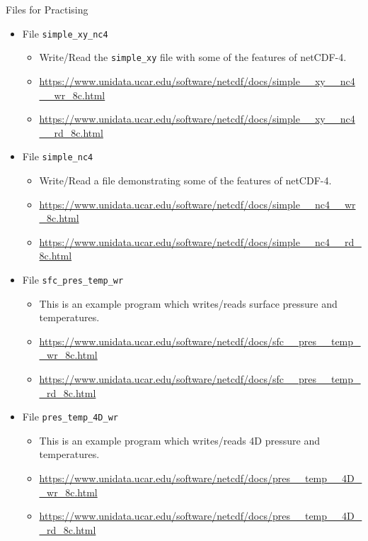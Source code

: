 \documentclass[compress,11pt,xcolor=svgnames,aspectratio=169]{beamer}
\begin{document}
\begin{frame}[fragile]{Files for Practising}

\begin{itemize}

  \item {\scriptsize File \verb|simple_xy_nc4|}
    \begin{itemize}
      \item {\scriptsize Write/Read the \verb|simple_xy| file with some of the features of netCDF-4.}
      \item {\tiny \url{https://www.unidata.ucar.edu/software/netcdf/docs/simple__xy__nc4__wr_8c.html}}
      \item {\tiny \url{https://www.unidata.ucar.edu/software/netcdf/docs/simple__xy__nc4__rd_8c.html}}
    \end{itemize}

  \item {\scriptsize File \verb|simple_nc4|}
    \begin{itemize}
      \item {\scriptsize Write/Read a file demonstrating some of the features of netCDF-4.}
      \item {\tiny \url{https://www.unidata.ucar.edu/software/netcdf/docs/simple__nc4__wr_8c.html}}
      \item {\tiny \url{https://www.unidata.ucar.edu/software/netcdf/docs/simple__nc4__rd_8c.html}}
    \end{itemize}

  \item {\scriptsize File \verb|sfc_pres_temp_wr|}
    \begin{itemize}
      \item {\scriptsize This is an example program which writes/reads surface pressure and temperatures.}
      \item {\tiny \url{https://www.unidata.ucar.edu/software/netcdf/docs/sfc__pres__temp__wr_8c.html}}
      \item {\tiny \url{https://www.unidata.ucar.edu/software/netcdf/docs/sfc__pres__temp__rd_8c.html}}
    \end{itemize}

  \item {\scriptsize File \verb|pres_temp_4D_wr|}
    \begin{itemize}
      \item {\scriptsize This is an example program which writes/reads 4D pressure and temperatures.}
      \item {\tiny \url{https://www.unidata.ucar.edu/software/netcdf/docs/pres__temp__4D__wr_8c.html}}
      \item {\tiny \url{https://www.unidata.ucar.edu/software/netcdf/docs/pres__temp__4D__rd_8c.html}}
    \end{itemize}

\end{itemize}

\end{frame}
\end{document}
